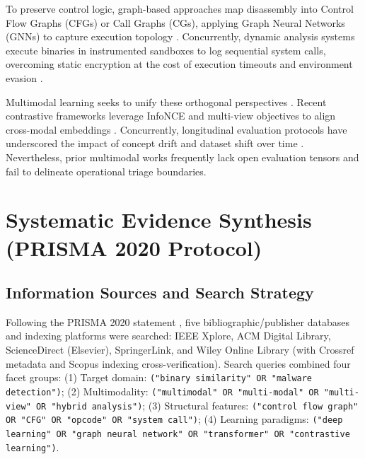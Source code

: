 \documentclass[pdflatex,sn-mathphys-num]{sn-jnl}
\begin{document}
To preserve control logic, graph-based approaches map disassembly into Control Flow Graphs (CFGs) or Call Graphs (CGs), applying Graph Neural Networks (GNNs) to capture execution topology \cite{Wu2021GNN,Qiang2022,SHIELD2026,Codeformer2023}. Concurrently, dynamic analysis systems execute binaries in instrumented sandboxes to log sequential system calls, overcoming static encryption at the cost of execution timeouts and environment evasion \cite{Landman2021DeepHook,MalInsight2019,Alzaylaee2020,SuarezTangil2018}.

Multimodal learning seeks to unify these orthogonal perspectives \cite{Baltrusaitis2019}. Recent contrastive frameworks leverage InfoNCE and multi-view objectives to align cross-modal embeddings \cite{LeKhac2020,FewMHGCL2023,BinCola2024}. Concurrently, longitudinal evaluation protocols have underscored the impact of concept drift and dataset shift over time \cite{Joyce2023MOTIF,Jiang2024BenchMFC,Guerra2022}. Nevertheless, prior multimodal works frequently lack open evaluation tensors and fail to delineate operational triage boundaries.

\section{Systematic Evidence Synthesis (PRISMA 2020 Protocol)}\label{sec:prisma}

\subsection{Information Sources and Search Strategy}\label{sec:prisma_sources}
Following the PRISMA 2020 statement \cite{Page2021PRISMA}, five bibliographic/publisher databases and indexing platforms were searched: IEEE Xplore, ACM Digital Library, ScienceDirect (Elsevier), SpringerLink, and Wiley Online Library (with Crossref metadata and Scopus indexing cross-verification). Search queries combined four facet groups: (1) Target domain: \texttt{("binary similarity" OR "malware detection")}; (2) Multimodality: \texttt{("multimodal" OR "multi-modal" OR "multi-view" OR "hybrid analysis")}; (3) Structural features: \texttt{("control flow graph" OR "CFG" OR "opcode" OR "system call")}; (4) Learning paradigms: \texttt{("deep learning" OR "graph neural network" OR "transformer" OR "contrastive learning")}.
\end{document}

